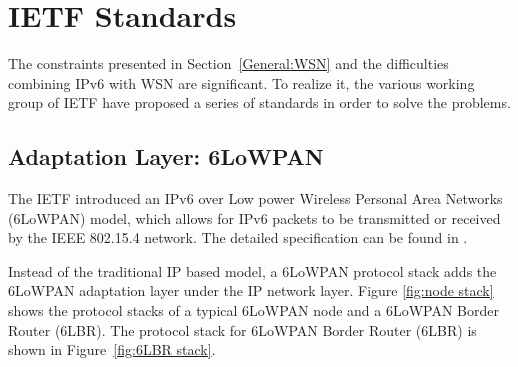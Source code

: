 \chapter{IETF Standards}
\label{IETF}
The constraints presented in Section~\ref{General:WSN} and the difficulties combining IPv6 with WSN are significant. To realize it, the various working group of IETF have proposed a series of standards in order to solve the problems.

\section{Adaptation Layer: 6LoWPAN}
\label{Intr:6LoWPAN}
The IETF introduced an IPv6 over Low power Wireless Personal Area Networks (6LoWPAN) model, which allows for IPv6 packets to be transmitted or received by the IEEE 802.15.4 network. The detailed specification can be found in \cite{RFC 4944}.
\newline

Instead of the traditional IP based model, a 6LoWPAN protocol stack adds the 6LoWPAN adaptation layer under the IP network layer. Figure \ref{fig:node stack} shows the protocol stacks of a typical 6LoWPAN node and a 6LoWPAN Border Router (6LBR)\@. The protocol stack for 6LoWPAN Border Router (6LBR) is shown in Figure~\ref{fig:6LBR stack}.

